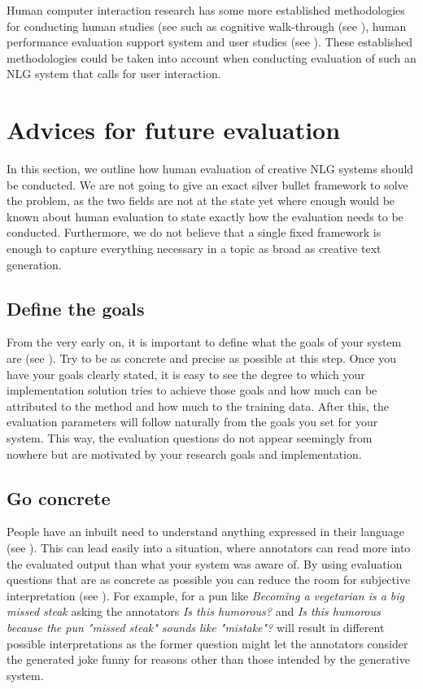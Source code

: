 \documentclass[11pt,a4paper]{article}
\begin{document}
Human computer interaction research has some more established methodologies for conducting human studies (see \citealt{jacko2012human,lazar2017research} such as cognitive walk-through (see \citealt{mahatody2010state}), human performance evaluation support system \cite{4395396} and user studies (see \citealt{mackenzie2015user}). These established methodologies could be taken into account when conducting evaluation of such an NLG system that calls for user interaction.

\section{Advices for future evaluation}

In this section, we outline how human evaluation of creative NLG systems should be conducted. We are not going to give an exact silver bullet framework to solve the problem, as the two fields are not at the state yet where enough would be known about human evaluation to state exactly how the evaluation needs to be conducted. Furthermore, we do not believe that a single fixed framework is enough to capture everything necessary in a topic as broad as creative text generation.

\subsection{Define the goals}

From the very early on, it is important to define what the goals of your system are (see \citealt{alnajjar2018master,jordanous2012standardised}). Try to be as concrete and precise as possible at this step. Once you have your goals clearly stated, it is easy to see the degree to which your implementation solution tries to achieve those goals and how much can be attributed to the method and how much to the training data. After this, the evaluation parameters will follow naturally from the goals you set for your system. This way, the evaluation questions do not appear seemingly from nowhere but are motivated by your research goals and implementation.

\subsection{Go concrete}

People have an inbuilt need to understand anything expressed in their language (see \citealt{Veale+2016+73+92}). This can lead easily into a situation, where annotators can read more into the evaluated output than what your system was aware of. By using evaluation questions that are as concrete as possible you can reduce the room for subjective interpretation (see \citealt{hamalainen2019let}). For example, for a pun like \textit{Becoming a vegetarian is a big missed steak} asking the annotators \textit{Is this humorous?} and \textit{Is this humorous because the pun "missed steak" sounds like "mistake"?} will result in different possible interpretations as the former question might let the annotators consider the generated joke funny for reasons other than those intended by the generative system.
\end{document}
